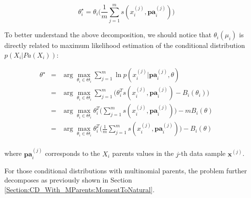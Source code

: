 \documentclass[11pt, oneside]{article}   	%
\newcommand{\bm}{\mathbf}
\numberwithin{figure}{section}
\numberwithin{equation}{section}
\numberwithin{table}{section}
\theoremstyle{definition}
\begin{document}
$$\theta_i^\star = \theta_i\Big(\frac{1}{m}\sum_{j=1}^m s(x_i^{(j)},\bm{pa}^{(j)}_i)\Big)$$

To better understand the above decomposition, we should notice that $\theta_i(\mu_i)$ is directly related to maximum likelihood estimation of the conditional distribution $p(X_i|Pa(X_i))$:

\begin{eqnarray*}
\theta^\star  &=& \arg\max_{\theta_i \in \Theta_i} \sum_{j=1}^m \ln p(x_i^{(j)}|\bm{pa}^{(j)}_i,\theta) \\
&=& \arg\max_{\theta_i \in \Theta_i} \sum_{j=1}^m \Big(\theta_i^Ts(x_i^{(j)},\bm{pa}^{(j)}_i)  - B_i(\theta_i) \Big)\\
&=& \arg\max_{\theta_i \in \Theta_i} \theta_i^T\Big(\sum_{j=1}^m s(x_i^{(j)},\bm{pa}^{(j)}_i) \Big)  - m B_i(\theta) \\
&=& \arg\max_{\theta_i \in \Theta_i} \theta_i^T\Big(\frac{1}{m}\sum_{j=1}^m s(x_i^{(j)},\bm{pa}^{(j)}_i) \Big)  - B_i(\theta) \\
\end{eqnarray*}

\noindent where $\bm{pa}^{(j)}_i$ corresponds to the $X_i$ parents values in the $j$-th data sample $\bm x^{(j)}$.

For those conditional distributions with multinomial parents, the problem further decomposes as previously shown in Section \ref{Section:CD_With_MParents:MomentToNatural}. 


%
%
%
%
%
\end{document}
